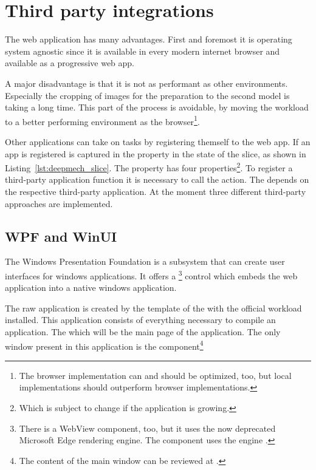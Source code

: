 \section{Third party integrations}

The web application has many advantages.
First and foremost it is operating system agnostic since it is available in every modern internet browser and available as a progressive web app. %

A major disadvantage is that it is not as performant as other environments.
Especially the cropping of images for the preparation to the second model is taking a long time.
This part of the process is avoidable, by moving the workload to a better performing environment as the browser\footnote{The browser implementation can and should be optimized, too, but local implementations should outperform browser implementations. }. %

Other applications can take on tasks by registering themself to the web app.
If an app is registered is captured in the  property in the state of the  slice, as shown in Listing~\ref{lst:deepmech_slice}.
The  property has four properties\footnote{Which is subject to change if the application is growing.}.
To register a third-party application function it is necessary to call the  action.
The  depends on the respective third-party application.
At the moment three different third-party approaches are implemented.

\subsection{WPF and WinUI}

The Windows Presentation Foundation is a subsystem that can create user interfaces for windows applications.
It offers a \footnote{There is a WebView component, too, but it uses the now deprecated Microsoft Edge rendering engine. The  component uses the  engine %
.} control which embeds the web application into a native windows application.

The raw application is created by the template  of the  with the official  workload installed.
This application consists of everything necessary to compile an application.
The  which will be the main page of the application.
The only window present in this application is the  component\footnote{The content of the main window can be reviewed at .}

